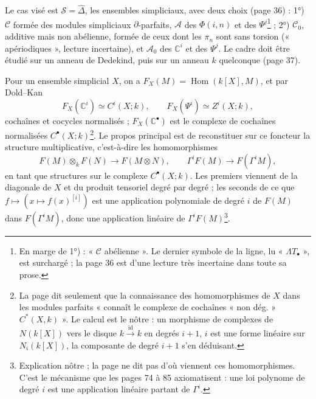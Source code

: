\documentclass[11pt,a4paper]{article}
\begin{document}
Le cas visé est $\mathcal{S} = \widehat{\Delta}$, les ensembles simpliciaux,
avec deux choix (page 36) : 1°) $\mathcal{C}$ formée des modules simpliciaux
$\partial$-parfaits, $\mathcal{A}$ des $\Phi(i,n)$ et des
$\Psi^{j}$\footnote{En marge de 1°) : « $\mathcal{C}$ abélienne ». Le dernier
symbole de la ligne, lu « $\Lambda T_{\bullet}$ », est surchargé ; la page
36 est d'une lecture très incertaine dans toute sa prose.} ; 2°)
$\mathcal{C}_{0}$, additive mais non abélienne, formée de ceux dont les
$\pi_{n}$ sont sans torsion (« apériodiques », lecture incertaine), et
$\mathcal{A}_{0}$ des $\mathbb{C}^{i}$ et des $\Psi^{j}$. Le cadre doit être
étudié sur un anneau de Dedekind, puis sur un anneau $k$ quelconque (page
37).

Pour un ensemble simplicial $X$, on a $F_{X}(M) = \operatorname{Hom}(k[X],
M)$, et par Dold–Kan
\[
  F_{X}(\mathbb{C}^{i}) \simeq C^{i}(X; k), \qquad F_{X}(\Psi^{i}) \simeq
  Z^{i}(X; k),
\]
cochaînes et cocycles normalisés ; $F_{X}(\mathbb{C}^{\bullet})$ est le
complexe de cochaînes normalisées $C^{\bullet}(X; k)$\footnote{La page dit
seulement que la connaissance des homomorphismes de $X$ dans les modules
parfaits « connaît le complexe de cochaînes « non dég. » $C^{*}(X, k)$ ». Le
calcul est le nôtre : un morphisme de complexes de $N(k[X])$ vers le disque
$k \xrightarrow{\mathrm{id}} k$ en degrés $i+1$, $i$ est une forme linéaire
sur $N_{i}(k[X])$, la composante de degré $i+1$ s'en déduisant.}. Le propos
principal est de reconstituer sur ce foncteur la structure multiplicative,
c'est-à-dire les homomorphismes
\[
  F(M) \otimes_{k} F(N) \to F(M \otimes N), \qquad \Gamma^{i}F(M) \to
  F(\Gamma^{i}M),
\]
en tant que structures sur le complexe $C^{\bullet}(X; k)$. Les premiers
viennent de la diagonale de $X$ et du produit tensoriel degré par degré ; les
seconds de ce que $f \mapsto (x \mapsto f(x)^{[i]})$ est une application
polynomiale de degré $i$ de $F(M)$ dans $F(\Gamma^{i}M)$, donc une
application linéaire de $\Gamma^{i}F(M)$\footnote{Explication nôtre ; la
page ne dit pas d'où viennent ces homomorphismes. C'est le
mécanisme que les pages 74 à 85 axiomatisent : une loi polynome de degré $i$
est une application linéaire partant de $\Gamma^{i}$.}.
\end{document}
